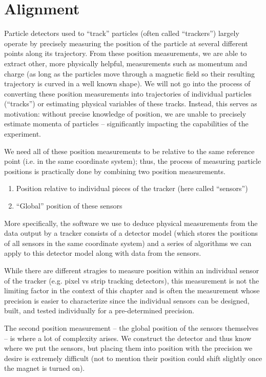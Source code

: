 \chapter{Alignment}
\label{chapter:hps:alignment}

Particle detectors used to ``track'' particles (often called ``trackers'') largely operate by
precisely measuring the position of the particle at several different points along its trajectory.
From these position measurements, we are able to extract other, more physically helpful,
measurements such as momentum and charge (as long as the particles move through a magnetic field so
their resulting trajectory is curved in a well known shape). We will not go into the process of
converting these position measurements into trajectories of individual particles (``tracks'') or
estimating physical variables of these tracks. Instead, this serves as motivation: without precise
knowledge of position, we are unable to precisely estimate momenta of particles -- significantly
impacting the capabilities of the experiment.

We need all of these position measurements to be relative to the same reference point (i.e. in the
same coordinate system); thus, the process of measuring particle positions is practically done by
combining two position measurements.
\begin{enumerate}
  \item Position relative to individual pieces of the tracker (here called ``sensors'')
  \item ``Global'' position of these sensors
\end{enumerate}
More specifically, the software we use to deduce physical measurements from the data
output by a tracker consists of a detector model (which stores the positions of all
sensors in the same coordinate system) and a series of algorithms we can apply to
this detector model along with data from the sensors.

While there are different stragies to measure position within an individual sensor of the tracker
(e.g. pixel vs strip tracking detectors), this measurement is not the limiting factor in the
context of this chapter and is often the measurement whose precision is easier to characterize
since the individual sensors can be designed, built, and tested individually for a pre-determined
precision.

The second position measurement -- the global position of the sensors themselves -- is where a lot
of complexity arises. We construct the detector and thus know where we put the sensors, but placing
them into position with the precision we desire is extremely difficult (not to mention their
position could shift slightly once the magnet is turned on).

